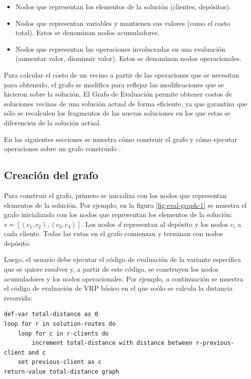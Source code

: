 \begin{itemize}
	\item Nodos que representan los elementos de la solución (clientes, depósitos).
	\item Nodos que representan variables y mantienen sus valores (como el costo total). Estos se denominan nodos acumuladores.
	\item Nodos que representan las operaciones involucradas en una evaluación (aumentar valor, disminuir valor). Estos se denominan nodos operacionales.
\end{itemize}

Para calcular el costo de un vecino a partir de las operaciones que se necesitan para obtenerlo, el grafo se modifica para reflejar las modificaciones que se hicieron sobre la solución. El Grafo de Evaluación permite obtener costos de soluciones vecinas de una solución actual de forma eficiente, ya que garantiza que sólo se recalculen los fragmentos de las nuevas soluciones en los que estas se diferencien de la solución actual.

En las siguientes secciones se muestra cómo construir el grafo y cómo ejecutar operaciones sobre un grafo construido .

\subsection{Creación del grafo}

Para construir el grafo, primero se inicializa con los nodos que representan elementos de la solución. Por ejemplo, en la figura \ref{fig:eval-graph-1} se muestra el grafo inicializado con los nodos que representan los elementos de la solución: $s = [(c_1,c_2), (c_3,c_4)]$. Los nodos \textit{d} representan al depósito y los nodos \textit{$c_i$} a cada cliente. Todas las rutas en el grafo comienzan y terminan con nodos depósito.

Luego, el usuario debe ejecutar el código de evaluación de la variante específica que se quiere resolver y, a partir de este código, se construyen los nodos acumuladores y los nodos operacionales. Por ejemplo, a continuación se muestra el código de evaluación de VRP básico en el que soólo se calcula la distancia recorrida:

\begin{lstlisting}
def-var total-distance as 0
loop for r in solution-routes do
	loop for c in r-clients do
		increment total-distance with distance between r-previous-client and c
	set previous-client as c
return-value total-distance graph
\end{lstlisting}

